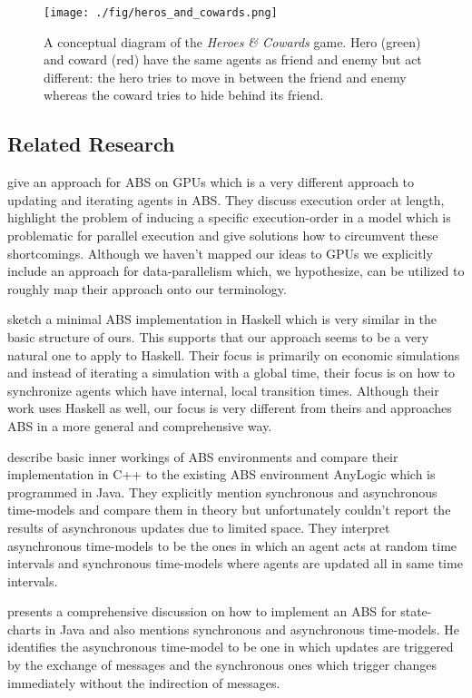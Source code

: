 \begin{figure}
	\centering
	\texttt{[image: ./fig/heros\_and\_cowards.png]}
	\caption{A conceptual diagram of the \textit{Heroes \& Cowards} game. Hero (green) and coward (red) have the same agents as friend and enemy but act different: the hero tries to move in between the friend and enemy whereas the coward tries to hide behind its friend.}
	\label{fig:heros_and_cowards}
\end{figure}

\subsection{Related Research}
\cite{lysenko_framework_2008} give an approach for ABS on GPUs which is a very different approach to updating and iterating agents in ABS. They discuss execution order at length, highlight the problem of inducing a specific execution-order in a model which is problematic for parallel execution and give solutions how to circumvent these shortcomings. Although we haven't mapped our ideas to GPUs we explicitly include an approach for data-parallelism which, we hypothesize, can be utilized to roughly map their approach onto our terminology. 
	
\cite{botta_time_2010} sketch a minimal ABS implementation in Haskell which is very similar in the basic structure of ours. This supports that our approach seems to be a very natural one to apply to Haskell. Their focus is primarily on economic simulations and instead of iterating a simulation with a global time, their focus is on how to synchronize agents which have internal, local transition times. Although their work uses Haskell as well, our focus is very different from theirs and approaches ABS in a more general and comprehensive way.

\cite{dawson_opening_2014} describe basic inner workings of ABS environments and compare their implementation in C++ to the existing ABS environment AnyLogic which is programmed in Java. They explicitly mention synchronous and asynchronous time-models and compare them in theory but unfortunately couldn't report the results of asynchronous updates due to limited space. They interpret asynchronous time-models to be the ones in which an agent acts at random time intervals and synchronous time-models where agents are updated all in same time intervals.

\cite{yuxuan_agent-based_2016} presents a comprehensive discussion on how to implement an ABS for state-charts in Java and also mentions synchronous and asynchronous time-models. He identifies the asynchronous time-model to be one in which updates are triggered by the exchange of messages and the synchronous ones which trigger changes immediately without the indirection of messages.